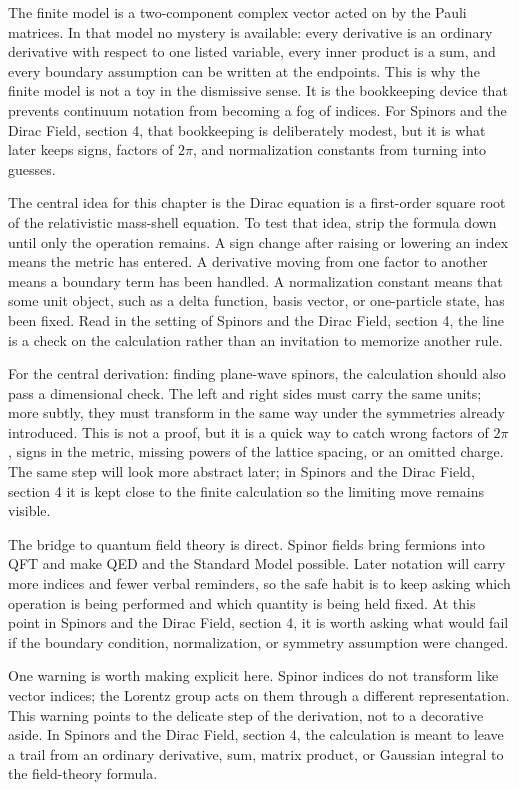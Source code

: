 The finite model is a two-component complex vector acted on by the Pauli matrices.  In that model no mystery is available: every derivative is an ordinary derivative with respect to one listed variable, every inner product is a sum, and every boundary assumption can be written at the endpoints.  This is why the finite model is not a toy in the dismissive sense.  It is the bookkeeping device that prevents continuum notation from becoming a fog of indices.  For Spinors and the Dirac Field, section 4, that bookkeeping is deliberately modest, but it is what later keeps signs, factors of \(2\pi\), and normalization constants from turning into guesses.

The central idea for this chapter is the Dirac equation is a first-order square root of the relativistic mass-shell equation.  To test that idea, strip the formula down until only the operation remains.  A sign change after raising or lowering an index means the metric has entered.  A derivative moving from one factor to another means a boundary term has been handled.  A normalization constant means that some unit object, such as a delta function, basis vector, or one-particle state, has been fixed.  Read in the setting of Spinors and the Dirac Field, section 4, the line is a check on the calculation rather than an invitation to memorize another rule.

For the central derivation: finding plane-wave spinors, the calculation should also pass a dimensional check.  The left and right sides must carry the same units; more subtly, they must transform in the same way under the symmetries already introduced.  This is not a proof, but it is a quick way to catch wrong factors of \(2\pi\), signs in the metric, missing powers of the lattice spacing, or an omitted charge.  The same step will look more abstract later; in Spinors and the Dirac Field, section 4 it is kept close to the finite calculation so the limiting move remains visible.

The bridge to quantum field theory is direct.  Spinor fields bring fermions into QFT and make QED and the Standard Model possible.  Later notation will carry more indices and fewer verbal reminders, so the safe habit is to keep asking which operation is being performed and which quantity is being held fixed.  At this point in Spinors and the Dirac Field, section 4, it is worth asking what would fail if the boundary condition, normalization, or symmetry assumption were changed.

One warning is worth making explicit here.  Spinor indices do not transform like vector indices; the Lorentz group acts on them through a different representation.  This warning points to the delicate step of the derivation, not to a decorative aside.  In Spinors and the Dirac Field, section 4, the calculation is meant to leave a trail from an ordinary derivative, sum, matrix product, or Gaussian integral to the field-theory formula.

